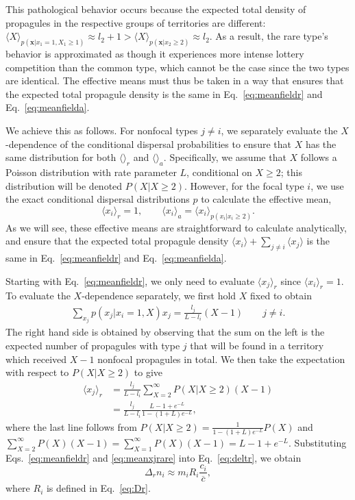 \documentclass[12pt]{article}
\begin{document}
This pathological behavior occurs because the expected total density of propagules in the respective groups of territories are different: $\langle X \rangle_{p({\mathbf x}|x_1=1,X_1\geq 1)}\approx l_2+1 > \langle X \rangle_{p({\mathbf x}|x_2\geq 2)}\approx l_2 $. As a result, the rare type's behavior is approximated as though it experiences more intense lottery competition than the common type, which cannot be the case since the two types are identical. The effective means must thus be taken in a way that ensures that the expected total propagule density is the same in Eq.~\eqref{eq:meanfieldr} and Eq.~\eqref{eq:meanfielda}. 

We achieve this as follows. For nonfocal types $j\neq i$, we separately evaluate the $X$-dependence of the conditional dispersal probabilities to ensure that $X$ has the same distribution for both $\langle \rangle_r$ and $\langle \rangle_a$. Specifically, we assume that $X$ follows a Poisson distribution with rate parameter $L$, conditional on $X\geq 2$; this distribution will be denoted $P(X|X\geq 2)$. However, for the focal type $i$, we use the exact conditional dispersal distributions $p$ to calculate the effective mean, 
\begin{equation}
\langle x_i \rangle_r=1,\qquad \langle x_i \rangle_a = \langle x_i \rangle_{p(x_i|x_i\geq 2)}. \label{eq:effectivefocal}
\end{equation}
As we will see, these effective means are straightforward to calculate analytically, and ensure that the expected total propagule density $\langle x_i \rangle + \sum_{j\neq i} \langle x_j \rangle$ is the same in Eq.~\eqref{eq:meanfieldr} and Eq.~\eqref{eq:meanfielda}.

Starting with Eq.~\eqref{eq:meanfieldr}, we only need to evaluate $\langle x_j \rangle_r$ since $\langle x_i \rangle_r=1$. To evaluate the $X$-dependence separately, we first hold $X$ fixed to obtain
\begin{align}
\sum_{x_j} p(x_j|x_i=1,X)x_j=\frac{l_j}{L-l_i}(X-1) \qquad j\neq i.
\label{eq:raremonster1}
\end{align}
The right hand side is obtained by observing that the sum on the left is the expected number of propagules with type $j$ that will be found in a territory which received $X-1$ nonfocal propagules in total. We then take the expectation with respect to $P(X|X\geq 2)$ to give
\begin{align}
\langle x_j \rangle_r&=\frac{l_j}{L-l_i}\sum_{X=2}^{\infty} P(X|X\geq 2) (X-1)\nonumber\\
&=\frac{l_j}{L-l_i}\frac{L-1+e^{-L}}{1-(1+L)e^{-L}},
\label{eq:meanxjrare}
\end{align}
where the last line follows from $P(X|X\geq 2) =\frac{1}{{1-(1+L)e^{-L}}}P(X)$ and $\sum_{X=2}^{\infty} P(X)(X-1)=\sum_{X=1}^{\infty} P(X)(X-1)=L-1+e^{-L}$. Substituting Eqs.~\eqref{eq:meanfieldr} and \eqref{eq:meanxjrare} into Eq.~\eqref{eq:deltr}, we obtain
\begin{equation}
\Delta_r n_i\approx m_i R_i\frac{c_i}{\overline{c}}, \label{eq:deltrfinal}
\end{equation}
where $R_i$ is defined in Eq.~\eqref{eq:Dr}.
\end{document}
